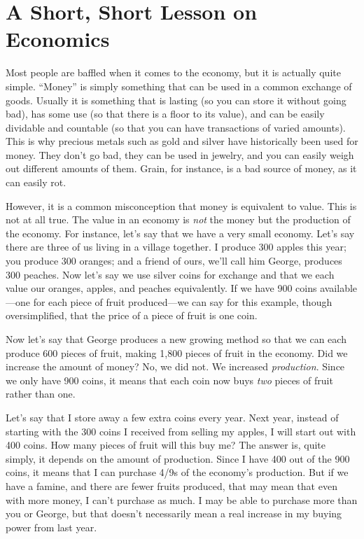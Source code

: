 \section{A Short, Short Lesson on Economics}

Most people are baffled when it comes to the economy, but it is actually
quite simple. “Money” is simply something that can be used in a common
exchange of goods. Usually it is something that is lasting (so you can
store it without going bad), has some use (so that there is a floor to
its value), and can be easily dividable and countable (so that you can
have transactions of varied amounts). This is why precious metals such
as gold and silver have historically been used for money. They don’t go
bad, they can be used in jewelry, and you can easily weigh out
different amounts of them. Grain, for instance, is a bad source of
money, as it can easily rot. 


However, it is a common misconception that money is equivalent to value.
This is not at all true. The value in an economy is \textit{not} the
money but the production of the economy. For instance, let’s say that
we have a very small economy. Let’s say there are three of us living in
a village together. I produce 300 apples this year; you produce 300
oranges; and a friend of ours, we’ll call him George, produces 300
peaches. Now let’s say we use silver coins for exchange and that we
each value our oranges, apples, and peaches equivalently.
If we have 900 coins
available—one for each piece of fruit produced—we can say for this
example, though
oversimplified, that the price of a piece of fruit is one coin. 


Now let’s say that George produces a new growing method so that we can
each produce 600 pieces of fruit,
making 1,800 pieces
of fruit in the economy. Did we increase the amount of money?  No, we
did not. We increased \textit{production}. Since we only have 900
coins, it means that each coin now buys \textit{two} pieces of fruit
rather than one.


Let’s say that I store away a few extra coins every year. Next year,
instead of starting with the 300 coins I received from selling my
apples, I will start out with 400 coins. How many pieces of fruit will
this buy me? The answer is, quite simply, it depends on the amount of
production. Since I have 400 out of the 900 coins, it means that I can
purchase 4/9s of the economy’s production. But if we have a famine, and
there are fewer fruits produced, that may mean that even with more
money, I can’t purchase as much. I may be able to purchase more than
you or George, but that doesn’t necessarily mean a real increase in my
buying power from last year.



